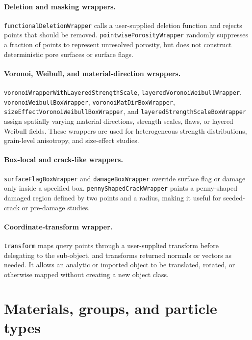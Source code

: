 \paragraph{Deletion and masking wrappers.}\texttt{functionalDeletionWrapper} calls a user-supplied deletion function and rejects points that should be removed.  \texttt{pointwisePorosityWrapper} randomly suppresses a fraction of points to represent unresolved porosity, but does not construct deterministic pore surfaces or surface flags.

\paragraph{Voronoi, Weibull, and material-direction wrappers.}\texttt{voronoiWrapperWithLayeredStrengthScale}, \texttt{layeredVoronoiWeibullWrapper}, \texttt{voronoiWeibullBoxWrapper}, \texttt{voronoiMatDirBoxWrapper}, \texttt{sizeEffectVoronoiWeibullBoxWrapper}, and \texttt{layeredStrengthScaleBoxWrapper} assign spatially varying material directions, strength scales, flaws, or layered Weibull fields.  These wrappers are used for heterogeneous strength distributions, grain-level anisotropy, and size-effect studies.

\paragraph{Box-local and crack-like wrappers.}\texttt{surfaceFlagBoxWrapper} and \texttt{damageBoxWrapper} override surface flag or damage only inside a specified box.  \texttt{pennyShapedCrackWrapper} paints a penny-shaped damaged region defined by two points and a radius, making it useful for seeded-crack or pre-damage studies.

\paragraph{Coordinate-transform wrapper.}\texttt{transform} maps query points through a user-supplied transform before delegating to the sub-object, and transforms returned normals or vectors as needed.  It allows an analytic or imported object to be translated, rotated, or otherwise mapped without creating a new object class.
\section{Materials, groups, and particle types}
\label{sec:pfw-materials}

